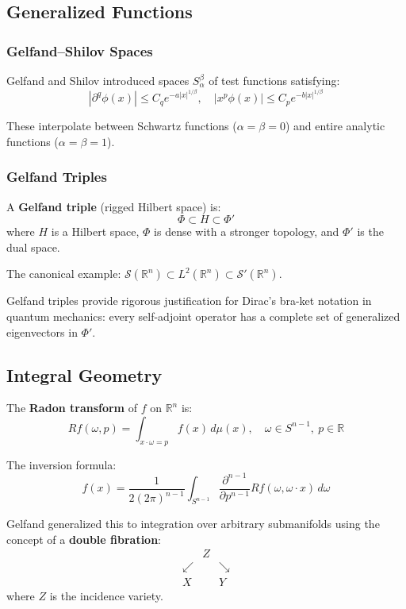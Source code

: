 \subsection{Generalized Functions}

\subsubsection{Gelfand--Shilov Spaces}

Gelfand and Shilov introduced spaces $S^\beta_\alpha$ of test functions satisfying:
\[
|\partial^q \phi(x)| \leq C_q e^{-a|x|^{1/\beta}}, \quad |x^p \phi(x)| \leq C_p e^{-b|x|^{1/\beta}}
\]

These interpolate between Schwartz functions ($\alpha = \beta = 0$) and entire analytic functions ($\alpha = \beta = 1$).

\subsubsection{Gelfand Triples}

A \textbf{Gelfand triple} (rigged Hilbert space) is:
\[
\Phi \subset H \subset \Phi'
\]
where $H$ is a Hilbert space, $\Phi$ is dense with a stronger topology, and $\Phi'$ is the dual space.

The canonical example: $\mathcal{S}(\mathbb{R}^n) \subset L^2(\mathbb{R}^n) \subset \mathcal{S}'(\mathbb{R}^n)$.

Gelfand triples provide rigorous justification for Dirac's bra-ket notation in quantum mechanics: every self-adjoint operator has a complete set of generalized eigenvectors in $\Phi'$.

\subsection{Integral Geometry}

The \textbf{Radon transform} of $f$ on $\mathbb{R}^n$ is:
\[
Rf(\omega, p) = \int_{x\cdot\omega = p} f(x)\,d\mu(x), \quad \omega \in S^{n-1},\ p \in \mathbb{R}
\]

The inversion formula:
\[
f(x) = \frac{1}{2(2\pi)^{n-1}} \int_{S^{n-1}} \frac{\partial^{n-1}}{\partial p^{n-1}} Rf(\omega, \omega \cdot x)\,d\omega
\]

Gelfand generalized this to integration over arbitrary submanifolds using the concept of a \textbf{double fibration}:
\[
\begin{array}{ccc}
& Z & \\
\swarrow && \searrow \\
X && Y
\end{array}
\]
where $Z$ is the incidence variety.

